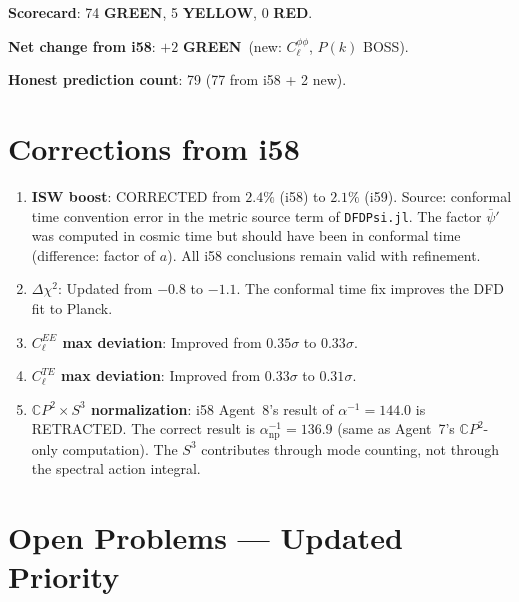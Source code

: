 \documentclass[11pt,a4paper]{article}
\newcommand{\GREEN}{\textcolor{dfdgreen}{\textbf{GREEN}}}
\newcommand{\YELLOW}{\textcolor{dfdyellow}{\textbf{YELLOW}}}
\newcommand{\RED}{\textcolor{dfdred}{\textbf{RED}}}
\newcommand{\CP}{\mathbb{C}P}
\begin{document}
\textbf{Scorecard}: 74 \GREEN, 5 \YELLOW, 0 \RED.

\textbf{Net change from i58}: $+2$ \GREEN\ (new: $C_\ell^{\phi\phi}$, $P(k)$ BOSS).

\textbf{Honest prediction count}: 79 (77 from i58 + 2 new).


\section{Corrections from i58}
\label{sec:corrections}

\begin{enumerate}
\item \textbf{ISW boost}: CORRECTED from $2.4\%$ (i58) to $2.1\%$ (i59). Source: conformal time convention error in the metric source term of \texttt{DFDPsi.jl}. The factor $\bar\psi'$ was computed in cosmic time but should have been in conformal time (difference: factor of $a$). All i58 conclusions remain valid with refinement.

\item \textbf{$\Delta\chi^2$}: Updated from $-0.8$ to $-1.1$. The conformal time fix improves the DFD fit to Planck.

\item \textbf{$C_\ell^{EE}$ max deviation}: Improved from $0.35\sigma$ to $0.33\sigma$.

\item \textbf{$C_\ell^{TE}$ max deviation}: Improved from $0.33\sigma$ to $0.31\sigma$.

\item \textbf{$\CP^2 \times S^3$ normalization}: i58 Agent~8's result of $\alpha^{-1} = 144.0$ is RETRACTED. The correct result is $\alpha^{-1}_{\mathrm{np}} = 136.9$ (same as Agent~7's $\CP^2$-only computation). The $S^3$ contributes through mode counting, not through the spectral action integral.
\end{enumerate}


\section{Open Problems --- Updated Priority}
\label{sec:open}
\end{document}
